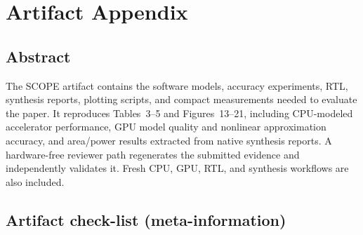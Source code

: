 \documentclass{sigplanconf}
\begin{document}

\appendix
\section{Artifact Appendix}
\small

\subsection{Abstract}

The SCOPE artifact contains the software models, accuracy experiments, RTL,
synthesis reports, plotting scripts, and compact measurements needed to
evaluate the paper.  It reproduces Tables~3--5 and Figures~13--21, including
CPU-modeled accelerator performance, GPU model quality and nonlinear
approximation accuracy, and area/power results extracted from native synthesis
reports.  A hardware-free reviewer path regenerates the submitted evidence and
independently validates it.  Fresh CPU, GPU, RTL, and synthesis workflows are
also included.

\subsection{Artifact check-list (meta-information)}
\end{document}
